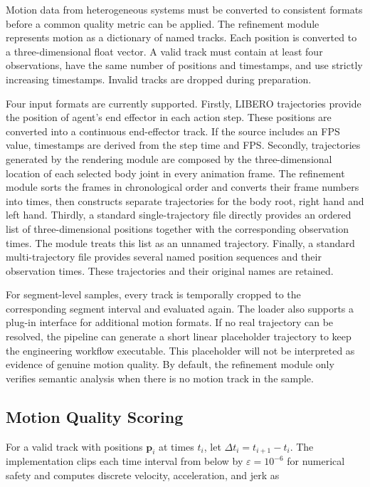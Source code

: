 \documentclass[11pt,oneside]{report}
\begin{document}
Motion data from heterogeneous systems must be converted to consistent formats before a common quality metric can be applied. The refinement module represents motion as a dictionary of named tracks. Each position is converted to a three-dimensional float vector. A valid track must contain at least four observations, have the same number of positions and timestamps, and use strictly increasing timestamps. Invalid tracks are dropped during preparation.

Four input formats are currently supported. Firstly, LIBERO trajectories provide the position of agent’s end effector in each action step. These positions are converted into a continuous end-effector track. If the source includes an FPS value, timestamps are derived from the step time and FPS. Secondly, trajectories generated by the rendering module are composed by the three-dimensional location of each selected body joint in every animation frame. The refinement module sorts the frames in chronological order and converts their frame numbers into times, then constructs separate trajectories for the body root, right hand and left hand. Thirdly, a standard single-trajectory file directly provides an ordered list of three-dimensional positions together with the corresponding observation times. The module treats this list as an unnamed trajectory. Finally, a standard multi-trajectory file provides several named position sequences and their observation times. These trajectories and their original names are retained.

For segment-level samples, every track is temporally cropped to the corresponding segment interval and evaluated again. The loader also supports a plug-in interface for additional motion formats. If no real trajectory can be resolved, the pipeline can generate a short linear placeholder trajectory to keep the engineering workflow executable. This placeholder will not be interpreted as evidence of genuine motion quality. By default, the refinement module only verifies semantic analysis when there is no motion track in the sample.

\subsection{Motion Quality Scoring}

For a valid track with positions $\mathbf{p}_i$ at times $t_i$, let $\Delta t_i=t_{i+1}-t_i$. The implementation clips each time interval from below by $\varepsilon=10^{-6}$ for numerical safety and computes discrete velocity, acceleration, and jerk as
\end{document}
